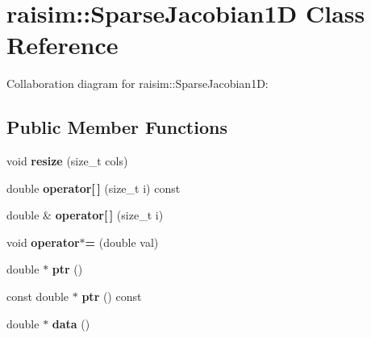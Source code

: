 \hypertarget{classraisim_1_1SparseJacobian1D}{}\section{raisim\+:\+:Sparse\+Jacobian1D Class Reference}
\label{classraisim_1_1SparseJacobian1D}


Collaboration diagram for raisim\+:\+:Sparse\+Jacobian1D\+:
\subsection*{Public Member Functions}
\begin{DoxyCompactItemize}
\item 
\mbox{\label{classraisim_1_1SparseJacobian1D_a204433a382d7936cabdaf8de6386a2a6}} 
void {\bfseries resize} (size\+\_\+t cols)
\item 
\mbox{\label{classraisim_1_1SparseJacobian1D_a527eeabbb0daf73e0bae7461dcbc3f42}} 
double {\bfseries operator\mbox{[}$\,$\mbox{]}} (size\+\_\+t i) const
\item 
\mbox{\label{classraisim_1_1SparseJacobian1D_a96fb7f2a739c6fccda61b30fe6cd1c5f}} 
double \& {\bfseries operator\mbox{[}$\,$\mbox{]}} (size\+\_\+t i)
\item 
\mbox{\label{classraisim_1_1SparseJacobian1D_a2ae461cc3e72d7817387328b638c4f2b}} 
void {\bfseries operator$\ast$=} (double val)
\item 
\mbox{\label{classraisim_1_1SparseJacobian1D_a5e9be52c3607110db409597dadeff6b4}} 
double $\ast$ {\bfseries ptr} ()
\item 
\mbox{\label{classraisim_1_1SparseJacobian1D_ad3d35c1709973620f827aa93a0808c07}} 
const double $\ast$ {\bfseries ptr} () const
\item 
\mbox{\label{classraisim_1_1SparseJacobian1D_af59b16ecf1868f7add2a1a8b055f3c7b}} 
double $\ast$ {\bfseries data} ()
\item 
\mbox{\label{classraisim_1_1SparseJacobian1D_afdbe5540751d461c51b85d4aec139511}} 

\end{DoxyCompactItemize}
